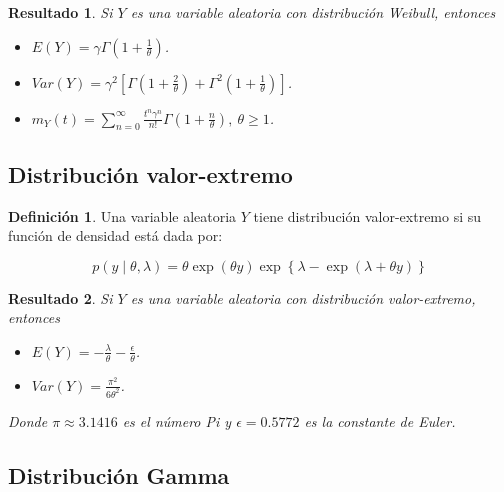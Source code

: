 \documentclass[
  10pt,
  spanish,
]{book}
\providecommand{\tightlist}{%
  \setlength{\itemsep}{0pt}\setlength{\parskip}{0pt}}
\newtheorem{proposition}{Resultado}[chapter]
\theoremstyle{definition}
\newtheorem{definition}{Definición}[chapter]
\theoremstyle{definition}
\theoremstyle{definition}
\theoremstyle{definition}
\theoremstyle{remark}
\begin{document}
\begin{proposition}
\protect\hypertarget{prp:unnamed-chunk-19}{}{\label{prp:unnamed-chunk-19} }Si \(Y\) es una variable aleatoria con distribución Weibull, entonces

\begin{itemize}
\tightlist
\item
  \(E(Y)=\gamma \Gamma\left(1+\frac{1}{\theta}\right)\).
\item
  \(Var(Y)=\gamma^2 \left[ \Gamma\left(1+\frac{2}{\theta}\right) + \Gamma^2\left(1+\frac{1}{\theta}\right)\right]\).
\item
  \(m_Y(t)=\sum_{n=0}^\infty \frac{t^n\gamma^n}{n!}\Gamma\left(1+\frac{n}{\theta}\right), \ \theta\geq 1\).
\end{itemize}
\end{proposition}

\hypertarget{distribuciuxf3n-valor-extremo}{%
\subsection{Distribución valor-extremo}\label{distribuciuxf3n-valor-extremo}}

\begin{definition}
\protect\hypertarget{def:unnamed-chunk-20}{}{\label{def:unnamed-chunk-20} }Una variable aleatoria \(Y\) tiene distribución valor-extremo si su función de densidad está dada por:

\begin{equation}
p(y \mid \theta, \lambda )= \theta \exp(\theta y)\exp\left\{\lambda-\exp(\lambda+\theta y)\right\}
\end{equation}
\end{definition}

\begin{proposition}
\protect\hypertarget{prp:unnamed-chunk-21}{}{\label{prp:unnamed-chunk-21} }Si \(Y\) es una variable aleatoria con distribución valor-extremo, entonces

\begin{itemize}
\tightlist
\item
  \(E(Y)=-\frac{\lambda}{\theta}-\frac{\epsilon}{\theta}\).
\item
  \(Var(Y)=\frac{\pi^2}{6\theta^2}\).
\end{itemize}

Donde \(\pi\approx 3.1416\) es el número Pi y \(\epsilon=0.5772\) es la constante de Euler.
\end{proposition}

\hypertarget{distribuciuxf3n-gamma}{%
\subsection{Distribución Gamma}\label{distribuciuxf3n-gamma}}
\end{document}
